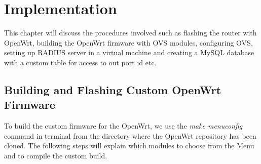 \chapter{Implementation} \label{ch:implementation}
This chapter will discuss the procedures involved such as flashing the router with OpenWrt, building the OpenWrt firmware with OVS modules, configuring OVS, setting up RADIUS server in a virtual machine and creating a MySQL database with a custom table for access to out port id etc.
\section{Building and Flashing Custom OpenWrt Firmware}
To build the custom firmware for the OpenWrt, we use the \textit{make menuconfig} command in terminal from the directory where the OpenWrt repository has been cloned. The following steps will explain which modules to choose from the Menu and to compile the custom build.
